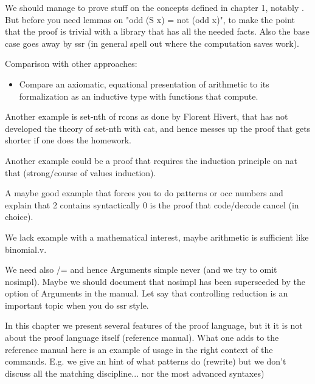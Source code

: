 We should manage to prove stuff on the concepts defined in chapter 1,
notably .  But before you need lemmas
on "odd (S x) = not (odd x)", to make the point that the proof is trivial with
a library that has all the needed facts.  Also the base case goes away by ssr (in general spell out where the computation saves work).

Comparison with other approaches:
\begin{itemize}
\item Compare an axiomatic, equational presentation of arithmetic to
  its formalization as an inductive type with functions that
  compute.
\end{itemize}


Another example is set-nth of rcons as done by Florent Hivert, that has not
developed the theory of set-nth with cat, and hence messes up the proof
that gets shorter if one does the homework.

Another example could be a proof that requires the induction principle
on nat that (strong/course of values induction).

A maybe good example that forces you to do patterns or occ numbers and explain
that 2  contains syntactically 0 is the proof that code/decode cancel (in
choice).

We lack example with a mathematical interest, maybe arithmetic is sufficient like binomial.v.

We need also /= and hence Arguments simple never (and we try to omit nosimpl).
Maybe we should document that nosimpl has been superseeded by
the option of Arguments in the manual.
Let say that controlling reduction is an important topic when you
do ssr style.

In this chapter we present several features of the proof language, but it it is
not about the proof language itself (reference manual). What one adds to the
reference manual here is an example of usage in the right context of the
commands.  E.g. we give an hint of what patterns do (rewrite) but we don't
discuss all the matching discipline... nor the most advanced syntaxes)
